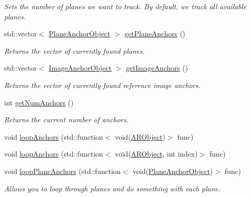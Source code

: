\begin{DoxyCompactItemize}
\begin{DoxyCompactList}\small\item\em Sets the number of planes we want to track. By default, we track all available planes. \end{DoxyCompactList}\item 
std\+::vector$<$ \mbox{\hyperlink{struct_a_r_objects_1_1_plane_anchor_object}{Plane\+Anchor\+Object}} $>$ \mbox{\hyperlink{class_a_r_core_1_1_a_r_anchor_manager_a46a02253729234aef5617512f48e9211}{get\+Plane\+Anchors}} ()
\begin{DoxyCompactList}\small\item\em Returns the vector of currently found planes. \end{DoxyCompactList}\item 
std\+::vector$<$ \mbox{\hyperlink{struct_a_r_objects_1_1_image_anchor_object}{Image\+Anchor\+Object}} $>$ \mbox{\hyperlink{class_a_r_core_1_1_a_r_anchor_manager_a9e4f4cc3de7334ff38184f6a00b619f5}{get\+Image\+Anchors}} ()
\begin{DoxyCompactList}\small\item\em Returns the vector of currently found reference image anchors. \end{DoxyCompactList}\item 
int \mbox{\hyperlink{class_a_r_core_1_1_a_r_anchor_manager_a68b5139137f46a426374178cd43b653d}{get\+Num\+Anchors}} ()
\begin{DoxyCompactList}\small\item\em Returns the current number of anchors. \end{DoxyCompactList}\item 
void \mbox{\hyperlink{class_a_r_core_1_1_a_r_anchor_manager_a687246a5f0aacaac63053c0e05081e11}{loop\+Anchors}} (std\+::function$<$ void(\mbox{\hyperlink{struct_a_r_objects_1_1_a_r_object}{A\+R\+Object}})$>$ func)
\item 
void \mbox{\hyperlink{class_a_r_core_1_1_a_r_anchor_manager_a03ee4092b5d958f8b1467e0a0e62f9b9}{loop\+Anchors}} (std\+::function$<$ void(\mbox{\hyperlink{struct_a_r_objects_1_1_a_r_object}{A\+R\+Object}}, int index)$>$ func)
\item 
void \mbox{\hyperlink{class_a_r_core_1_1_a_r_anchor_manager_a170e30f7226b84eaede22392f08d5521}{loop\+Plane\+Anchors}} (std\+::function$<$ void(\mbox{\hyperlink{struct_a_r_objects_1_1_plane_anchor_object}{Plane\+Anchor\+Object}})$>$ func)
\begin{DoxyCompactList}\small\item\em Allows you to loop through planes and do something with each plane. \end{DoxyCompactList}\item 

\end{DoxyCompactItemize}
